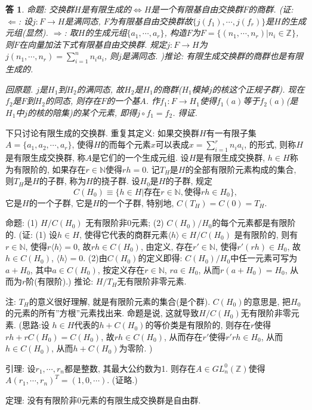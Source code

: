 \documentclass{ctexart}%
\newtheorem*{solution}{答}
\theoremstyle{definition}
\theoremstyle{remark}
\begin{document}
\begin{solution}
命题: 交换群$H$是有限生成的$\Longleftrightarrow$$H$是一个有限基自由交换群$F$的商群. (证: $\Longleftarrow$: 设$j: F\rightarrow H$是满同态, $F$为有限基自由交换群故$\{j(f_1),\cdots,j(f_r)\}$是$H$的生成元组(显然). $\Longrightarrow$: 取$H$的生成元组$\{a_1,\cdots,a_r\}$, 构造$F$为$F=\{(n_1,\cdots,n_r)|n_i\in \mathbb{Z}\}$,  则$F$在向量加法下式有限基自由交换群. 规定$j: F\rightarrow H$为$j(n_1,\cdots, n_r)=\sum\limits_{i=1}^nn_ia_i$, 则$j$是满同态. )推论: 有限生成交换群的商群也是有限生成的.

回原题. $j$是$H_1$到$H_2$的满同态, 故$H_2$是$H_1$的商群($H_1$模掉$j$的核这个正规子群). 现在$f_2$是$F$到$H_2$的同态, 则存在$F$的一个基$A$. 作$f_1:F\rightarrow H_1$使得$f_1(a)$等于$f_2(a)$(是$H_1$中$j$的核的陪集)的某个元素, 即得$j\circ f_1 = f_2$. 得证. 
\end{solution}

下只讨论有限生成的交换群. 重复其定义: 如果交换群$H$有一有限子集$A=\{a_1,a_2,\cdots,a_r\}$, 使得$H$的而每个元素$x$可以表成$x=\sum_{i=1}^rn_ia_i$, 的形式, 则称$H$是有限生成交换群, 称$A$是它们的一个生成元组. 设$H$是有限生成交换群, $h\in H$称为有限阶的, 如果存在$r\in \mathbb{N}$使得$rh=0$. 记$T_H$是$H$的全部有限阶元素构成的集合, 则$T_H$是$H$的子群, 称为$H$的挠子群. 设$H_0$是$H$的子群, 规定
$$C(H_0)\equiv \{h\in H|\text{存在}r\in \mathbb{N}, \text{使得}rh\in H_0\},$$
它是$H$的一个子群, 它是$H$的一个子群, 特别地, $C(T_H)=C(0)=T_H$. 

命题: (1) $H/C(H_0)$ 无有限阶非0元素; (2) $C(H_0)/H_0$的每个元素都是有限阶的. (证: (1) 设$h\in H$, 使得它代表的商群元素$\langle h\rangle \in H/C(H_0)$ 是有限阶的, 则有$r\in \mathbb{N}$, 使得$r\langle h\rangle  = 0$, 故$rh \in C(H_0)$, 由定义, 存在$r'\in \mathbb{N}$, 使得$r'(rh)\in H_0$, 故$h\in C(H_0)$, $\langle h\rangle =0$. (2)由$C(H_0)$的定义即得: $C(H_0)/H_0$中任一元素可写为$a+H_0$, 其中$a\in C(H_0)$, 按定义存在$r\in \mathbb{N}$, $ra\in H_0$, 从而$r(a+H_0) =H_0$, 从而为$r$阶(有限阶).) 推论: $H/T_H$无有限阶非零元素. 

注: $T_H$的意义很好理解, 就是有限阶元素的集合(是个群). $C(H_0)$的意思是, 把$H_0$的元素的所有''方根''元素找出来. 命题是说, 这就导致$H/C(H_0)$无有限阶非零元素. (思路:设 $h\in H$代表的$h+C(H_0)$的等价类是有限阶的, 则存在$r$使得$rh+rC(H_0)=C(H_0)$, 故$rh\in C(H_0)$, 从而存在$r'$使得$r'rh\in H_0$, 从而$h\in C(H_0)$, 从而$h+C(H_0)$为零阶. )

引理: 设$r_1,\cdots, r_n$都是整数, 其最大公约数为1. 则存在$A\in GL^0_n(\mathbb{Z})$使得$A
(r_1,\cdots,r_n)^T=(1,0,\cdots)$. (证略.)

定理: 没有有限阶非0元素的有限生成交换群是自由群. 
\end{document}
